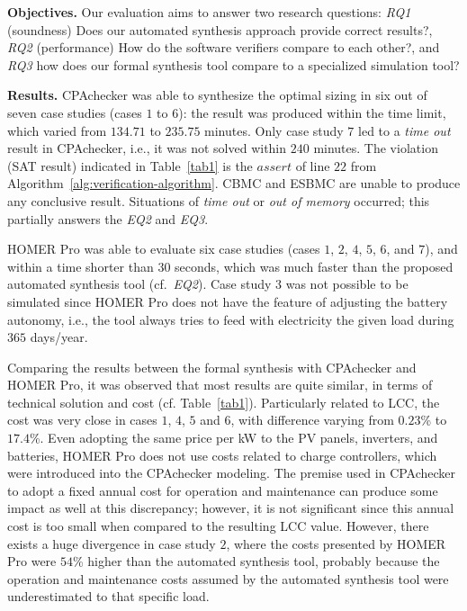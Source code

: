 \documentclass[runningheads]{llncs}
\begin{document}
\textbf{Objectives.} Our evaluation aims to answer two research questions: \textit{RQ1} (soundness) Does our automated synthesis approach provide correct results?, \textit{RQ2} (performance) How do the software verifiers compare to each other?, and \textit{RQ3} how does our formal synthesis tool compare to a specialized simulation tool?

\textbf{Results.}  CPAchecker was able to synthesize the optimal sizing in six out of seven case studies (cases $1$ to $6$): the result was produced within the time limit, which varied from $134.71$ to $235.75$ minutes. %
Only case study $7$ led to a \textit{time out} result in CPAchecker, i.e., it was not solved within $240$ minutes. %
The violation (SAT result) indicated in Table~\ref{tab1} 
is the $assert$ of line $22$ from Algorithm~\ref{alg:verification-algorithm}. CBMC and ESBMC are unable to produce any conclusive result. Situations of \textit{time out} or \textit{out of memory} occurred; this partially answers the \textit{EQ2} and \textit{EQ3}. 

HOMER Pro was able to evaluate six case studies (cases $1$, $2$, $4$, $5$, $6$, and $7$), and within a time shorter than $30$ seconds, which was much faster than the proposed automated synthesis tool (cf.~\textit{EQ2}). Case study $3$ was not possible to be simulated since HOMER Pro does not have the feature of adjusting the battery autonomy, i.e., the tool always tries to feed with electricity the given load during $365$ days/year. 

Comparing the results between the formal synthesis with CPAchecker and HOMER Pro, it was observed that most results are quite similar, in terms of technical solution and cost (cf. Table~\ref{tab1}). Particularly related to LCC, the cost was very close in cases $1$, $4$, $5$ and $6$, with difference varying from $0.23$\% to $17.4$\%. Even adopting the same price per kW to the PV panels, inverters, and batteries, HOMER Pro does not use costs related to charge controllers, which were introduced into the CPAchecker modeling. The premise used in CPAchecker to adopt a fixed annual cost for operation and maintenance can produce some impact as well at this discrepancy; however, it is not significant since this annual cost is too small when compared to the resulting LCC value. However, there exists a huge divergence in case study $2$, where the costs presented by HOMER Pro were $54$\% higher than the automated synthesis tool, probably because the operation and maintenance costs assumed by the automated synthesis tool were underestimated to that specific load. 
\end{document}
